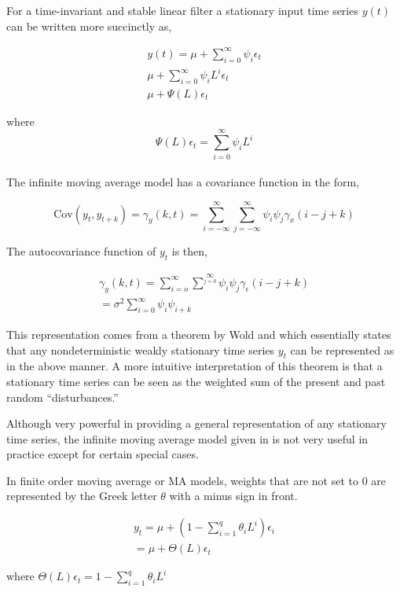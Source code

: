 \documentclass[
  11pt,
]{article}
\numberwithin{equation}{section}
\begin{document}
For a time-invariant and stable linear filter a stationary input time
series \(y(t)\) can be written more succinctly as,

\begin{gather*}
y(t) = \mu + \sum\limits_{i= 0}^{\infty}\psi_{i}\epsilon_{t} \\[8pt]
\mu + \sum\limits_{i=0}^{\infty}\psi_{i}L^{i}\epsilon_{t} \\[8pt]
\mu + \Psi(L)\epsilon_{t}
\end{gather*}

where \[
  \Psi(L)\epsilon_{t} = \sum\limits_{i=0}^{\infty}\psi_{i}L^{i}
  \]\\
The infinite moving average model has a covariance function in the form,

\[
\mathrm{Cov}(y_{t}, y_{t+k}) = \gamma_{y}(k, t) = \sum\limits_{i = -\infty}^{\infty}\sum\limits_{j = - \infty}^{\infty}\psi_{i}\psi_{j}\gamma_{x}(i - j + k)
\]

The autocovariance function of \(y_{t}\) is then,

\begin{gather*}
\gamma_{y}(k, t) = \sum\limits_{i = o}^{\infty}\sum^{\infty}\limits_{j = 0} \psi_{i}\psi_{j}\gamma_{\epsilon}(i-j+k) \\[8pt]
= \sigma^{2}\sum\limits_{i = 0}^{\infty}\psi_{i}\psi_{i + k}
\end{gather*}

This representation comes from a theorem by Wold and which essentially
states that any nondeterministic weakly stationary time series \(y_{t}\)
can be represented as in the above manner. A more intuitive
interpretation of this theorem is that a stationary time series can be
seen as the weighted sum of the present and past random
``disturbances.''

Although very powerful in providing a general representation of any
stationary time series, the infinite moving average model given in is
not very useful in practice except for certain special cases.

In finite order moving average or MA models, weights that are not set to
0 are represented by the Greek letter \(\theta\) with a minus sign in
front.

\begin{gather*}
y_{t} = \mu + \left(1 - \sum\limits_{i=1}^{q}\theta_{i}L^{i} \right)\epsilon_{i}\\[8pt]
= \mu + \Theta(L)\epsilon_{t}
\end{gather*}

where
\(\Theta(L)\epsilon_{t} = 1 - \sum\limits_{i=1}^{q}\theta_{i}L^{i}\)
\end{document}
